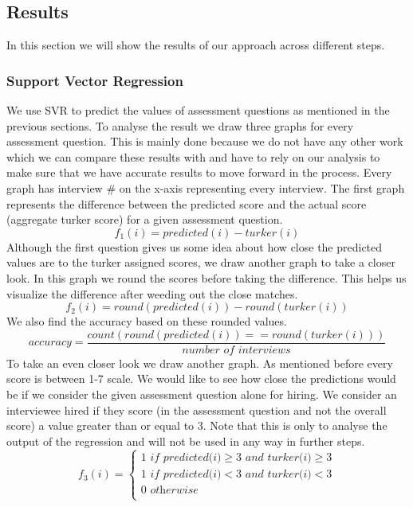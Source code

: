 \documentclass[11pt]{article}
\begin{document}
\subsection{Results}
In this section we will show the results of our approach across different steps.
\subsubsection{Support Vector Regression}
We use SVR to predict the values of assessment questions as mentioned in the previous sections. To analyse the result we draw three graphs for every assessment question. This is mainly done because we do not have any other work which we can compare these results with and have to rely on our analysis to make sure that we have accurate results to move forward in the process. Every graph has interview \# on the x-axis representing every interview. The first graph represents the difference between the predicted score and the actual score (aggregate turker score) for a given assessment question. 
\begin{equation}
 f_1(i) = predicted(i) - turker(i)
\end{equation}
Although the first question gives us some idea about how close the predicted values are to the turker assigned scores, we draw another graph to take a closer look. In this graph we round the scores before taking the difference. This helps us visualize the difference after weeding out the close matches.
\begin{equation}
 f_2(i) = round(predicted(i)) - round(turker(i))
\end{equation}
We also find the accuracy based on these rounded values.
\begin{equation}
 accuracy = \frac{count(round(predicted(i)) == round(turker(i)))}{\textit{number of interviews}}
\end{equation}
To take an even closer look we draw another graph. As mentioned before every score is between 1-7 scale. We would like to see how close the predictions would be if we consider the given assessment question alone for hiring. We consider an interviewee hired if they score (in the assessment question and not the overall score) a value greater than or equal to 3. Note that this is only to analyse the output of the regression and will not be used in any way in further steps.
\begin{equation}
     f_3(i) = \left\{
                \begin{array}{ll}
                  1 \textit{ if predicted(i)} \geq 3 \textit{ and  turker(i)} \geq 3\\
                  1 \textit{ if predicted(i)} < 3 \textit{ and  turker(i)} < 3\\
                  0 \textit{ otherwise}\\
                \end{array}
              \right.
\end{equation}
\end{document}
